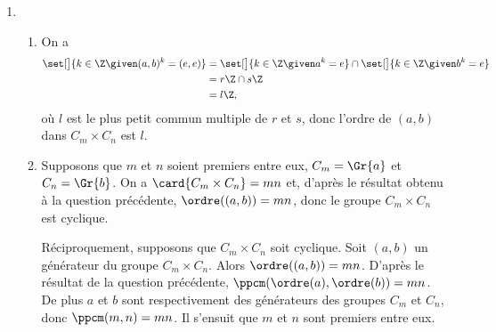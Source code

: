 \begin{enumerate}[1)]
  \item 
    \begin{enumerate}
      \item 
        On a
        \begin{align*}
          \set[\big]{k\in\Z \given (a,b)^k = (e,e)}
            &= \set[\big]{k\in\Z \given a^k = e} \cap \set[\big]{k\in\Z \given b^k = e} \\
            &= r\Z \cap s\Z \\
            &= l\Z,
        \end{align*}
        où $l$ est le plus petit commun multiple de $r$ et $s$, donc l'ordre de $(a,b)$ dans $C_m\times C_n$ est $l$.

      \item
        Supposons que $m$ et $n$ soient premiers entre eux,  $C_m = \Gr{a}$ et $C_n = \Gr{b}$.
        On a $\card{C_m\times C_n} = mn$ et, d'après le résultat obtenu à la question précédente, $\ordre((a,b)) = mn$, donc le groupe $C_m\times C_n$ est cyclique.

        Réciproquement, supposons que $C_m\times C_n$ soit cyclique.
        Soit $(a,b)$ un générateur du groupe $C_m\times C_n$.
        Alors $\ordre((a,b)) = mn$.
        D'après le résultat de la question précédente, $\ppcm(\ordre(a),\ordre(b)) = mn$.
        De plus $a$ et $b$ sont respectivement des générateurs des groupes $C_m$ et $C_n$, donc $\ppcm(m,n) = mn$.
        Il s'ensuit que $m$ et $n$ sont premiers entre eux.
    \end{enumerate}
\end{enumerate}
